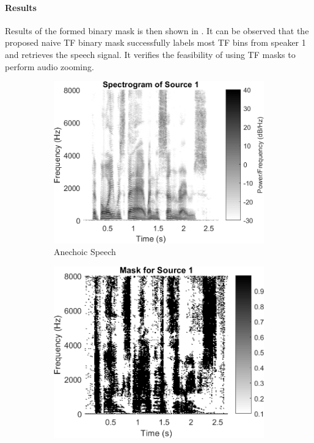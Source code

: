 \documentclass[a4paper,twoside,12pt,hidelinks]{article}
\begin{document}
\paragraph{Results}
Results of the formed binary mask is then shown in . It can be observed that the proposed naive TF binary mask successfully labels most TF bins from speaker 1 and retrieves the speech signal. It verifies the feasibility of using TF masks to perform audio zooming.
\begin{figure}[H]
\centering	
\begin{subfigure}[H]{0.49\textwidth}
\includegraphics[width=\textwidth]{spectsrc1}
\caption{Anechoic Speech}
\end{subfigure}
\begin{subfigure}[H]{0.49\textwidth}
\includegraphics[width=\textwidth]{naivemask1}

\end{subfigure}
\end{figure}
\end{document}
